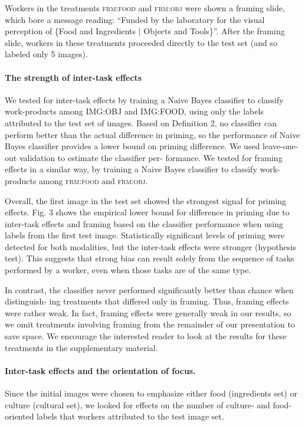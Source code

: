 \documentclass[12pt]{article}
\begin{document}
Workers in the treatments \textsc{frm:food} and \textsc{frm:obj} were shown a 
framing slide, which bore a message reading: ``Funded by the laboratory for 
the visual perception of \{Food and Ingredients $\vert$ Objects and Tools\}''. 
After the framing slide, workers in these treatments proceeded directly to 
the test set (and so labeled only 5 images).

\paragraph{The strength of inter-task effects}
We tested for inter-task effects by training a Naive Bayes classifier to 
classify work-products among IMG:OBJ and IMG:FOOD, using only the labels 
attributed to the test set of images. Based on Definition 2, no classifier 
can perform better than the actual difference in priming, so the performance 
of Naive Bayes classifier provides a lower bound on priming difference. We 
used leave-one-out validation to estimate the classifier per- formance. We 
tested for framing effects in a similar way, by training a Naive Bayes 
classifier to classify work-products among \textsc{frm:food} and 
\textsc{frm:obj}.

Overall, the first image in the test set showed the strongest signal for 
priming effects. Fig. 3 shows the empirical lower bound for difference in 
priming due to inter-task effects and framing based on the classifier 
performance when using labels from the first test image. Statistically 
significant levels of priming were detected for both modalities, but the 
inter-task effects were stronger (hypothesis test). This suggests that strong 
bias can result solely from the sequence of tasks performed by a worker, even 
when those tasks are of the same type.

In contrast, the classifier never performed significantly better than chance 
when distinguish- ing treatments that differed only in framing. Thus, framing 
effects were rather weak. In fact, framing effects were generally weak in our 
results, so we omit treatments involving framing from the remainder of our 
presentation to save space. We encourage the interested reader to look at the 
results for these treatments in the supplementary material.

\paragraph{Inter-task effects and the orientation of focus.}
Since the initial images were chosen to emphasize either food (ingredients 
set) or culture (cultural set), we looked for effects on the number of 
culture- and food-oriented labels that workers attributed to the test image 
set.
\end{document}
